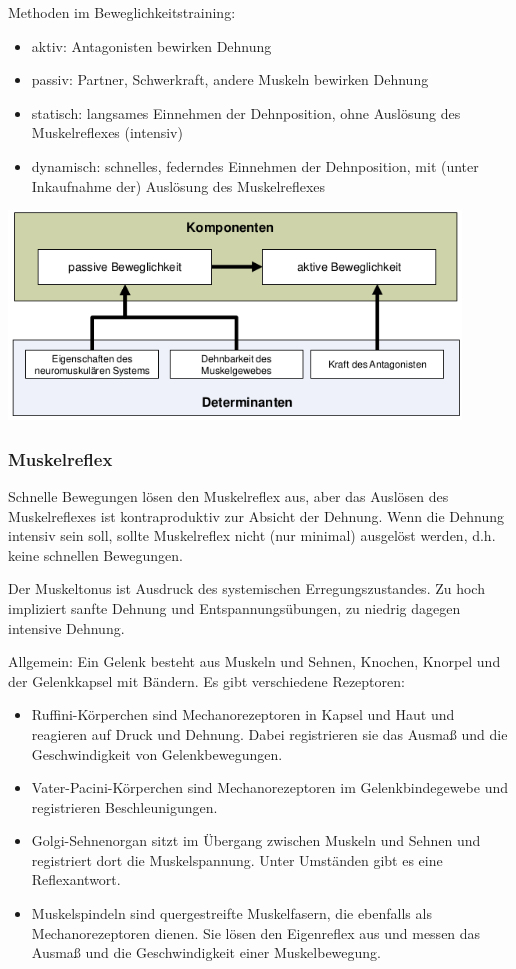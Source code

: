Methoden im Beweglichkeitstraining:
\begin{itemize}
    \item aktiv: Antagonisten bewirken Dehnung
    \item passiv: Partner, Schwerkraft, andere Muskeln bewirken Dehnung
    \item statisch: langsames Einnehmen der Dehnposition, ohne Auslösung des Muskelreflexes (intensiv)
    \item dynamisch: schnelles, federndes Einnehmen der Dehnposition, mit (unter Inkaufnahme der) Auslösung des Muskelreflexes
\end{itemize}

\includegraphics[width=0.9\textwidth]{pictures/beweg_determinanten2}

\subsubsection*{Muskelreflex}

Schnelle Bewegungen lösen den Muskelreflex aus, aber das Auslösen des Muskelreflexes ist kontraproduktiv zur Absicht der Dehnung. Wenn die Dehnung intensiv sein soll, sollte Muskelreflex nicht (nur minimal) ausgelöst werden, d.h. keine schnellen Bewegungen.

Der Muskeltonus ist Ausdruck des systemischen Erregungszustandes. Zu hoch impliziert sanfte Dehnung und Entspannungsübungen, zu niedrig dagegen intensive Dehnung.

Allgemein:
Ein Gelenk besteht aus Muskeln und Sehnen, Knochen, Knorpel und der Gelenkkapsel mit Bändern.
Es gibt verschiedene Rezeptoren:
\begin{itemize}
    \item Ruffini-Körperchen sind Mechanorezeptoren in Kapsel und Haut und reagieren auf Druck und Dehnung. Dabei registrieren sie das Ausmaß und die Geschwindigkeit von Gelenkbewegungen.
    \item Vater-Pacini-Körperchen sind Mechanorezeptoren im Gelenkbindegewebe und registrieren Beschleunigungen.
    \item Golgi-Sehnenorgan sitzt im Übergang zwischen Muskeln und Sehnen und registriert dort die Muskelspannung. Unter Umständen gibt es eine Reflexantwort.
    \item Muskelspindeln sind quergestreifte Muskelfasern, die ebenfalls als Mechanorezeptoren dienen. Sie lösen den Eigenreflex aus und messen das Ausmaß und die Geschwindigkeit einer Muskelbewegung.
\end{itemize}


